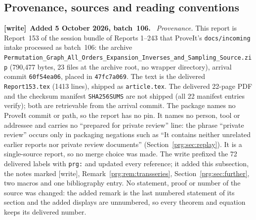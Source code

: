 \documentclass[11pt,letterpaper]{article}
\numberwithin{equation}{section}
\theoremstyle{definition}\newtheorem{definition}[theorem]{Definition}
\theoremstyle{remark}\newtheorem{remark}[theorem]{Remark}
\newcommand{\file}[1]{\nolinkurl{#1}}
\newenvironment{writenote}[1][]{\par\smallskip\begingroup\small
 \noindent\textbf{[write]}\if\relax\detokenize{#1}\relax\else~\textbf{#1.}\fi\ }%
 {\par\endgroup\smallskip}
\begin{document}
\subsection{Provenance, sources and reading conventions}\label{prg:sec:provenance}
\begin{writenote}[Added 5 October 2026, batch~106]
\emph{Provenance.} This report is Report~153 of the session bundle of
Reports 1--243 that ProveIt's \file{docs/incoming} intake processed as
batch~106: the archive
\file{Permutation_Graph_All_Orders_Expansion_Inverses_and_Sampling_Source.zip}
(790{,}477 bytes, 23 files at the archive root, no wrapper directory),
arrival commit \file{60f54ea06}, placed in \file{47fc7a069}. The text is the
delivered \file{Report153.tex} (1413 lines), shipped as \file{article.tex}.
The delivered 22-page PDF and the checksum manifest \file{SHA256SUMS} are not
shipped (all 22 manifest entries verify); both are retrievable from the
arrival commit. The package names no ProveIt commit or path, so the report
has no pin. It names no person, tool or addressee and carries no ``prepared
for private review'' line: the phrase ``private review'' occurs only in
packaging negations such as ``It contains neither unrelated earlier reports
nor private review documents'' (Section~\ref{prg:sec:replay}). It is a
single-source report, so no merge choice was made. The write prefixed the 72
delivered labels with \file{prg:} and updated every reference; it added this
subsection, the notes marked [write], Remark~\ref{prg:rem:transseries},
Section~\ref{prg:sec:further}, two macros and one bibliography entry. No
statement, proof or number of the source was changed: the added remark is the
last numbered statement of its section and the added displays are unnumbered,
so every theorem and equation keeps its delivered number.


\end{writenote}
\end{document}
